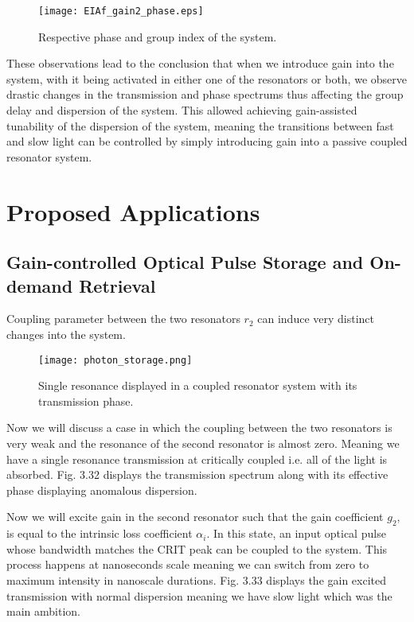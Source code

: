 \begin{figure}[h]
\centering
\texttt{[image: EIAf\_gain2\_phase.eps]}
\caption{Respective phase and group index of the system.}
\end{figure}

These observations lead to the conclusion that when we introduce gain into the system, with it being activated in either one of the resonators or both, we observe drastic changes in the transmission and phase spectrums thus affecting the group delay and dispersion of the system. This allowed achieving gain-assisted tunability of the dispersion of the system, meaning the transitions between fast and slow light can be controlled by simply introducing gain into a passive coupled resonator system.


\section{Proposed Applications}
\subsection{Gain-controlled Optical Pulse Storage and On-demand Retrieval}
Coupling parameter between the two resonators $r_{2}$ can induce very distinct changes into the system.

\begin{figure}[h]
\centering 
\texttt{[image: photon\_storage.png]}
\caption{Single resonance displayed in a coupled resonator system with its transmission phase.}
\end{figure}

Now we will discuss a case in which the coupling between the two resonators is very weak and the resonance of the second resonator is almost zero. Meaning we have a single resonance transmission at critically coupled i.e. all of the light is absorbed. Fig. 3.32 displays the transmission spectrum along with its effective phase displaying anomalous dispersion. 

Now we will excite gain in the second resonator such that the gain coefficient $g_{2}$, is equal to the intrinsic loss coefficient $\alpha_{i}$. In this state, an input optical pulse whose bandwidth matches the CRIT peak can be coupled to the system. This process happens at nanoseconds scale meaning we can switch from zero to maximum intensity in nanoscale durations. Fig. 3.33 displays the gain excited transmission with normal dispersion meaning we have slow light which was the main ambition.

